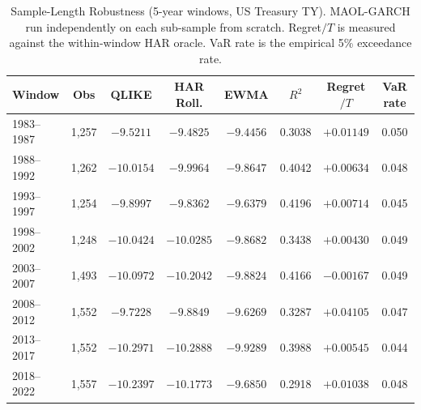 \begin{table}[H]
\centering
\caption{Sample-Length Robustness (5-year windows, US Treasury TY). MAOL-GARCH run independently on each sub-sample from scratch. Regret$/T$ is measured against the within-window HAR oracle. VaR rate is the empirical 5\% exceedance rate.}
\label{tab:sl_5y}
\small
\begin{tabular}{lccccccc}
\toprule
Window & Obs & QLIKE & HAR Roll. & EWMA & $R^2$ & Regret$/T$ & VaR rate \\
\midrule
1983--1987 & 1,257 & $-9.5211$ & $-9.4825$ & $-9.4456$ & 0.3038 & $+0.01149$ & 0.050 \\
1988--1992 & 1,262 & $-10.0154$ & $-9.9964$ & $-9.8647$ & 0.4042 & $+0.00634$ & 0.048 \\
1993--1997 & 1,254 & $-9.8997$ & $-9.8362$ & $-9.6379$ & 0.4196 & $+0.00714$ & 0.045 \\
1998--2002 & 1,248 & $-10.0424$ & $-10.0285$ & $-9.8682$ & 0.3438 & $+0.00430$ & 0.049 \\
2003--2007 & 1,493 & $-10.0972$ & $-10.2042$ & $-9.8824$ & 0.4166 & $-0.00167$ & 0.049 \\
2008--2012 & 1,552 & $-9.7228$ & $-9.8849$ & $-9.6269$ & 0.3287 & $+0.04105$ & 0.047 \\
2013--2017 & 1,552 & $-10.2971$ & $-10.2888$ & $-9.9289$ & 0.3988 & $+0.00545$ & 0.044 \\
2018--2022 & 1,557 & $-10.2397$ & $-10.1773$ & $-9.6850$ & 0.2918 & $+0.01038$ & 0.048 \\
\bottomrule
\end{tabular}
\end{table}
